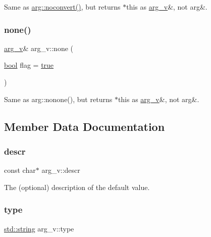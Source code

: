 Same as {\ttfamily \mbox{\hyperlink{structarg_affdcf2c99a2f27cb539efd6853335d4b}{arg\+::noconvert()}}}, but returns $\ast$this as \mbox{\hyperlink{structarg__v}{arg\+\_\+v}}\&, not arg\&. 

\mbox{\label{structarg__v_a3d487f117dc8f3af6555519ab160716a}} 
\subsubsection{\texorpdfstring{none()}{none()}}
{\footnotesize\ttfamily \mbox{\hyperlink{structarg__v}{arg\+\_\+v}}\& arg\+\_\+v\+::none (\begin{DoxyParamCaption}\item[{\mbox{\hyperlink{asdl_8h_af6a258d8f3ee5206d682d799316314b1}{bool}}}]{flag = {\ttfamily \mbox{\hyperlink{asdl_8h_af6a258d8f3ee5206d682d799316314b1a08f175a5505a10b9ed657defeb050e4b}{true}}} }\end{DoxyParamCaption})\hspace{0.3cm}{\ttfamily [inline]}}



Same as {\ttfamily arg\+::nonone()}, but returns $\ast$this as \mbox{\hyperlink{structarg__v}{arg\+\_\+v}}\&, not arg\&. 



\subsection{Member Data Documentation}
\mbox{\label{structarg__v_a0a50cfb966acfce71fd61974a31f2a75}} 
\subsubsection{\texorpdfstring{descr}{descr}}
{\footnotesize\ttfamily const char$\ast$ arg\+\_\+v\+::descr}



The (optional) description of the default value. 

\mbox{\label{structarg__v_a772bc79a04bfa30ab09034927be549ad}} 
\subsubsection{\texorpdfstring{type}{type}}
{\footnotesize\ttfamily \mbox{\hyperlink{_s_d_l__opengl__glext_8h_ab4ccfaa8ab0e1afaae94dc96ef52dde1}{std\+::string}} arg\+\_\+v\+::type}



